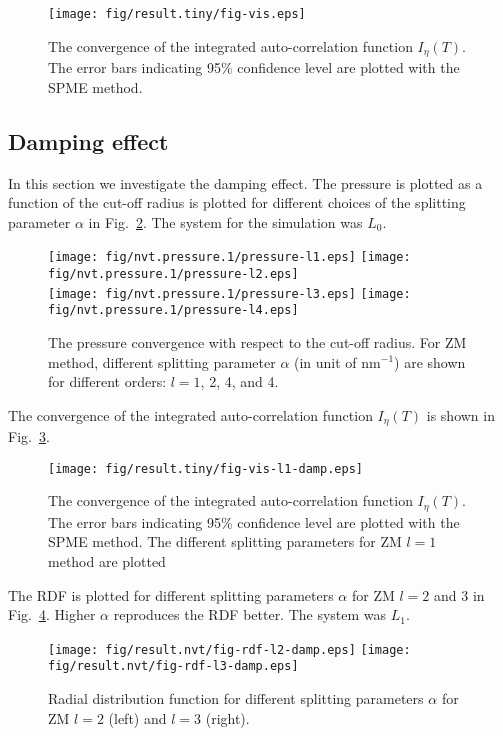 \documentclass[aip,jcp,a4paper,preprint,unsortedaddress,onecolumn,fleqn]{revtex4-1}
\begin{document}
\begin{figure}
  \centering
  \texttt{[image: fig/result.tiny/fig-vis.eps]}
  \caption{The convergence of the integrated auto-correlation function $I_\eta(T) $. The error bars indicating 95\% confidence level are plotted with the SPME method.}
  \label{fig:tmp4}
\end{figure}


\subsection{Damping effect}

In this section we investigate the damping effect. The pressure is plotted as a function of  the cut-off radius is plotted for different choices of
the splitting parameter $\alpha$ in Fig.~\ref{fig:damp-pres}. The system for the simulation was $L_0$.
\begin{figure}
  \centering
  \texttt{[image: fig/nvt.pressure.1/pressure-l1.eps]}
  \texttt{[image: fig/nvt.pressure.1/pressure-l2.eps]}\\
  \texttt{[image: fig/nvt.pressure.1/pressure-l3.eps]}
  \texttt{[image: fig/nvt.pressure.1/pressure-l4.eps]}
  \caption{The pressure convergence with respect to the cut-off radius.
    For ZM method, different splitting parameter $\alpha$ (in unit of $\textrm{nm}^{-1}$) are shown for different orders:  $l=1$, 2, 4, and 4.
  }
  \label{fig:damp-pres}
\end{figure}

The convergence of the integrated auto-correlation function $I_\eta(T) $ is shown in Fig.~\ref{fig:damp-vis-l1}.
\begin{figure}
  \centering
  \texttt{[image: fig/result.tiny/fig-vis-l1-damp.eps]}
  \caption{The convergence of the integrated auto-correlation function $I_\eta(T) $. The error bars indicating 95\% confidence level are plotted with the SPME method. The different splitting parameters for ZM $l=1$ method are plotted}
  \label{fig:damp-vis-l1}
\end{figure}


The RDF is plotted for different splitting parameters $\alpha$ for ZM $l=2$ and 3 in Fig.~\ref{fig:damp-rdf-l23}. Higher $\alpha$ reproduces the RDF better.
The system was $L_1$.
\begin{figure}[]
  \centering
  \texttt{[image: fig/result.nvt/fig-rdf-l2-damp.eps]}
  \texttt{[image: fig/result.nvt/fig-rdf-l3-damp.eps]}
  \caption{Radial distribution function for different splitting parameters $\alpha$ for ZM $l=2$ (left) and $l=3$ (right).}
  \label{fig:damp-rdf-l23}
\end{figure}
\end{document}
